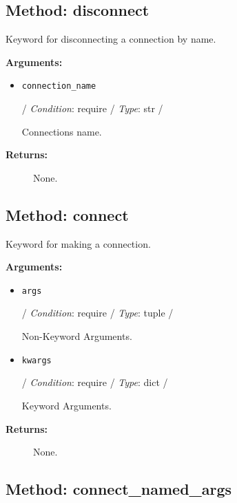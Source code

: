 \hypertarget{qconnectbase-connection-manager-method-disconnect-30}{%
\subsection{Method: disconnect}\label{qconnectbase-connection-manager-method-disconnect-30}}

Keyword for disconnecting a connection by name.

\textbf{Arguments:}

\begin{itemize}
\item
  \texttt{connection\_name}

  / \emph{Condition}: require / \emph{Type}: str /

  Connection\textquotesingle s name.
\end{itemize}

\begin{description}
\item[\textbf{Returns:}]
None.
\end{description}

\hypertarget{qconnectbase-connection-manager-method-connect-31}{%
\subsection{Method: connect}\label{qconnectbase-connection-manager-method-connect-31}}

Keyword for making a connection.

\textbf{Arguments:}

\begin{itemize}
\item
  \texttt{args}

  / \emph{Condition}: require / \emph{Type}: tuple /

  Non-Keyword Arguments.
\item
  \texttt{kwargs}

  / \emph{Condition}: require / \emph{Type}: dict /

  Keyword Arguments.
\end{itemize}

\begin{description}
\item[\textbf{Returns:}]
None.
\end{description}

\hypertarget{qconnectbase-connection-manager-method-connect_named_args-32}{%
\subsection{Method:
connect\_named\_args}\label{qconnectbase-connection-manager-method-connect_named_args-32}}

